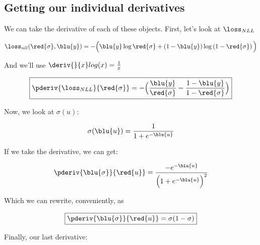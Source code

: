    \subsection{Getting our individual derivatives}
    
        We can take the derivative of each of these objects. First, let's look at $\loss_{NLL}$
        
        \begin{equation*}
            \loss_{nll}
            (\red{\sigma}, \blu{y})
            =
            -
            \Big(
                \blu{y} \log{ \red{\sigma} }
                +
                \left( 1 - \blu{y} \right)
                \log
                \left( 1 - \red{\sigma} \right) 
            \Big)
        \end{equation*}
        
        And we'll use $\deriv{}{x} log(x) = \frac{1}{x}$
        
        \begin{equation}
        \boxed{
            \pderiv{ \loss_{NLL} }{\red{\sigma}} =
            -
            \Big(
                \frac{ \blu{y} } { \red{\sigma} } 
                -
                \frac{ 1-\blu{y} } { 1 - \red{\sigma} }
            \Big)
        }
        \end{equation}
        
        Now, we look at $\sigma(u)$:
        
        \begin{equation}
            \sigma(\blu{u}) = \frac{1}{1+e^{-\blu{u} }}
        \end{equation}
        
        If we take the derivative, we can get:
        
        \begin{equation}
            \pderiv{ \blu{\sigma} }{\red{u}}
            =
            \frac{ -e^{ -\blu{u} } }{ \Big(   1+e^{ -\blu{u} }   \Big)^2 }
        \end{equation}
        
        Which we can rewrite, conveniently, as
        
        \begin{equation}
        \boxed{
            \pderiv{ \blu{\sigma} }{\red{u}}
            =
            \sigma (1-\sigma)
        }
        \end{equation}
        
        Finally, our last derivative:
        
